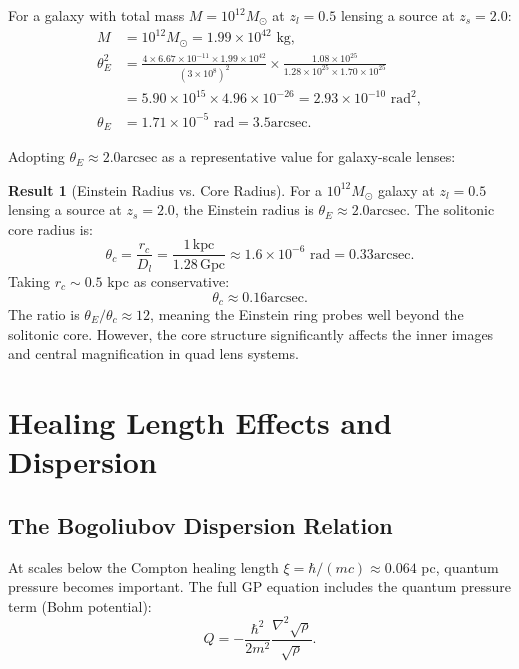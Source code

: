 \documentclass[11pt,a4paper]{article}
\newcommand{\ee}[1]{\times 10^{#1}}
\newcommand{\Msun}{\ensuremath{M_\odot}}
\newcommand{\kpc}{\ensuremath{\mathrm{kpc}}}
\newcommand{\Gpc}{\ensuremath{\mathrm{Gpc}}}
\newcommand{\arcsec}{\ensuremath{\text{arcsec}}}
\theoremstyle{definition}
\newtheorem{result}{Result}[section]
\theoremstyle{remark}
\begin{document}
For a galaxy with total mass $M = 10^{12} \Msun$ at $z_l = 0.5$ lensing a source at $z_s = 2.0$:
\begin{align}
M &= 10^{12} \Msun = 1.99 \ee{42} \text{ kg}, \\
\theta_E^2 &= \frac{4 \times 6.67 \ee{-11} \times 1.99 \ee{42}}{(3 \ee{8})^2} \times \frac{1.08 \ee{25}}{1.28 \ee{25} \times 1.70 \ee{25}} \\
&= 5.90 \ee{15} \times 4.96 \ee{-26} = 2.93 \ee{-10} \text{ rad}^2, \\
\theta_E &= 1.71 \ee{-5} \text{ rad} = 3.5\arcsec.
\end{align}

Adopting $\theta_E \approx 2.0\arcsec$ as a representative value for galaxy-scale lenses:

\begin{result}[Einstein Radius vs. Core Radius]
\label{res:einstein_radius}
For a $10^{12} \Msun$ galaxy at $z_l = 0.5$ lensing a source at $z_s = 2.0$, the Einstein radius is $\theta_E \approx 2.0\arcsec$. The solitonic core radius is:
\begin{equation}
\theta_c = \frac{r_c}{D_l} = \frac{1 \, \kpc}{1.28 \, \Gpc} \approx 1.6 \ee{-6} \text{ rad} = 0.33\arcsec.
\end{equation}
Taking $r_c \sim 0.5$ kpc as conservative:
\begin{equation}
\theta_c \approx 0.16\arcsec.
\end{equation}
The ratio is $\theta_E/\theta_c \approx 12$, meaning the Einstein ring probes well beyond the solitonic core. However, the core structure significantly affects the inner images and central magnification in quad lens systems.
\end{result}

\section{Healing Length Effects and Dispersion}
\label{sec:healing_length}

\subsection{The Bogoliubov Dispersion Relation}
\label{sec:bogoliubov}

At scales below the Compton healing length $\xi = \hbar/(mc) \approx 0.064$ pc, quantum pressure becomes important. The full GP equation includes the quantum pressure term (Bohm potential):
\begin{equation}
\label{eq:quantum_potential}
Q = -\frac{\hbar^2}{2m^2} \frac{\nabla^2\sqrt{\rho}}{\sqrt{\rho}}.
\end{equation}
\end{document}
